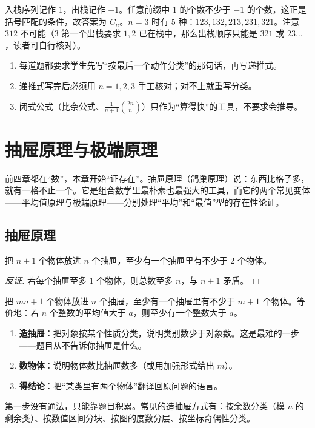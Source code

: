 \sol 入栈序列记作 $1$，出栈记作 $-1$。任意前缀中 $1$ 的个数不少于 $-1$ 的个数，这正是括号匹配的条件，故答案为 $C_n$。$n=3$ 时有 $5$ 种：$123,132,213,231,321$。注意 $312$ 不可能（$3$ 第一个出栈要求 $1,2$ 已在栈中，那么出栈顺序只能是 $321$ 或 $23\ldots$，读者可自行核对）。

\begin{teach}[递推章的教学要点]
\begin{enumerate}
\item 每道题都要求学生先写“按最后一个动作分类”的那句话，再写递推式。
\item 递推式写完后必须用 $n=1,2,3$ 手工核对；对不上就重写分类。
\item 闭式公式（比奈公式、$\frac1{n+1}\binom{2n}{n}$）只作为“算得快”的工具，不要求会推导。
\end{enumerate}
\end{teach}

\chapter{抽屉原理与极端原理}
\begin{chapterintro}[章节导读]
前四章都在“数”，本章开始“证存在”。抽屉原理（鸽巢原理）说：东西比格子多，就有一格不止一个。它是组合数学里最朴素也最强大的工具，而它的两个常见变体——平均值原理与极端原理——分别处理“平均”和“最值”型的存在性论证。
\end{chapterintro}

\section{抽屉原理}
\begin{theorem}[抽屉原理]
把 $n+1$ 个物体放进 $n$ 个抽屉，至少有一个抽屉里有不少于 $2$ 个物体。
\end{theorem}
\begin{proof}[反证]
若每个抽屉至多 $1$ 个物体，则总数至多 $n$，与 $n+1$ 矛盾。
\end{proof}

\begin{theorem}[抽屉原理的加强形式]
把 $mn+1$ 个物体放进 $n$ 个抽屉，至少有一个抽屉里有不少于 $m+1$ 个物体。等价地：若 $n$ 个整数的平均值大于 $a$，则至少有一个整数大于 $a$。
\end{theorem}

\begin{teach}[抽屉原理的三步讲法]
\begin{enumerate}
\item \textbf{造抽屉}：把对象按某个性质分类，说明类别数少于对象数。这是最难的一步——题目从不告诉你抽屉是什么。
\item \textbf{数物体}：说明物体数比抽屉数多（或用加强形式给出 $m$）。
\item \textbf{得结论}：把“某类里有两个物体”翻译回原问题的语言。
\end{enumerate}
第一步没有通法，只能靠题目积累。常见的造抽屉方式有：按余数分类（模 $n$ 的剩余类）、按数值区间分块、按图的度数分层、按坐标奇偶性分类。
\end{teach}

